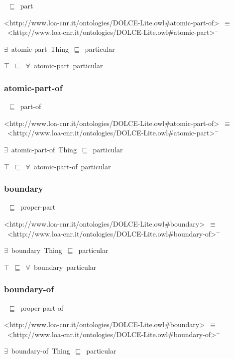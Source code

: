 \documentclass{article}
\begin{document}
~\ensuremath{\sqsubseteq}~part

<http://www.loa-cnr.it/ontologies/DOLCE-Lite.owl#atomic-part-of>~\ensuremath{\equiv}~<http://www.loa-cnr.it/ontologies/DOLCE-Lite.owl#atomic-part>\ensuremath{^-}

\ensuremath{\exists}~atomic-part~Thing~\ensuremath{\sqsubseteq}~particular

\ensuremath{\top}~\ensuremath{\sqsubseteq}~\ensuremath{\forall}~atomic-part~particular

\subsubsection*{atomic-part-of}

~\ensuremath{\sqsubseteq}~part-of

<http://www.loa-cnr.it/ontologies/DOLCE-Lite.owl#atomic-part-of>~\ensuremath{\equiv}~<http://www.loa-cnr.it/ontologies/DOLCE-Lite.owl#atomic-part>\ensuremath{^-}

\ensuremath{\exists}~atomic-part-of~Thing~\ensuremath{\sqsubseteq}~particular

\ensuremath{\top}~\ensuremath{\sqsubseteq}~\ensuremath{\forall}~atomic-part-of~particular

\subsubsection*{boundary}

~\ensuremath{\sqsubseteq}~proper-part

<http://www.loa-cnr.it/ontologies/DOLCE-Lite.owl#boundary>~\ensuremath{\equiv}~<http://www.loa-cnr.it/ontologies/DOLCE-Lite.owl#boundary-of>\ensuremath{^-}

\ensuremath{\exists}~boundary~Thing~\ensuremath{\sqsubseteq}~particular

\ensuremath{\top}~\ensuremath{\sqsubseteq}~\ensuremath{\forall}~boundary~particular

\subsubsection*{boundary-of}

~\ensuremath{\sqsubseteq}~proper-part-of

<http://www.loa-cnr.it/ontologies/DOLCE-Lite.owl#boundary>~\ensuremath{\equiv}~<http://www.loa-cnr.it/ontologies/DOLCE-Lite.owl#boundary-of>\ensuremath{^-}

\ensuremath{\exists}~boundary-of~Thing~\ensuremath{\sqsubseteq}~particular
\end{document}
